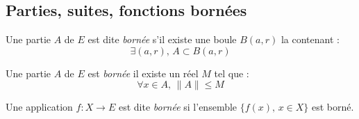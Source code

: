 \documentclass[11pt,a4paper,fleqn,pdftex]{report}
\begin{document}
\subsection{Parties, suites, fonctions bornées} %
\label{sub:parties_suites_fonctions_bornees}
\begin{dfn}
     Une partie $A$ de $E$ est dite \emph{bornée} s'il existe une boule $B(a,r)$ la contenant : 
     \begin{equation}
     \exists(a,r),\, A \subset B(a,r)
     \end{equation}
\end{dfn}
\begin{theorem}
     Une partie $A$ de $E$ est \emph{bornée} \ssi{} il existe un réel $M$ tel que :
     \begin{equation}
     \forall x\in A,\, \| A \| \le M
     \end{equation}
\end{theorem}
\begin{dfn}
     Une application $f:X\to E$ est dite \emph{bornée} si l'ensemble $\lbrace f(x),\, x\in X\rbrace $ est borné.
\end{dfn}
\end{document}
